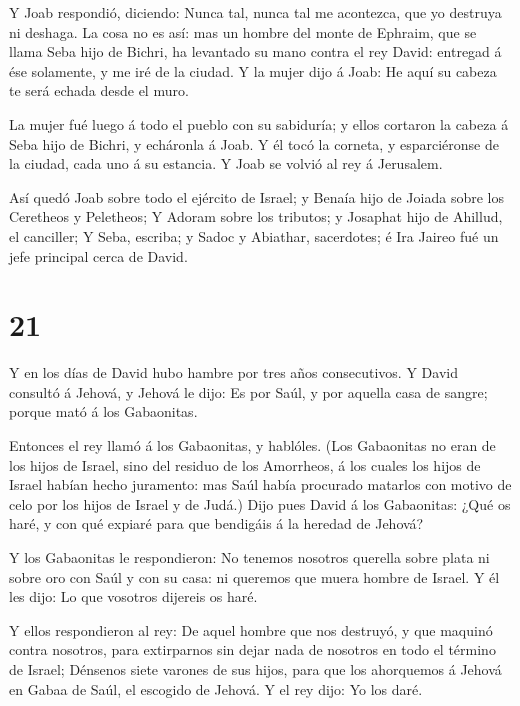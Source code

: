  Y Joab respondió, diciendo: Nunca tal, nunca tal me
acontezca, que yo destruya ni deshaga.  La cosa no es así:
mas un hombre del monte de Ephraim, que se llama Seba hijo de Bichri, ha
levantado su mano contra el rey David: entregad á ése solamente, y me
iré de la ciudad. Y la mujer dijo á Joab: He aquí su cabeza te será
echada desde el muro.

 La mujer fué luego á todo el pueblo con su sabiduría; y
ellos cortaron la cabeza á Seba hijo de Bichri, y echáronla á Joab. Y él
tocó la corneta, y esparciéronse de la ciudad, cada uno á su estancia. Y
Joab se volvió al rey á Jerusalem.

 Así quedó Joab sobre todo el ejército de Israel; y Benaía
hijo de Joiada sobre los Ceretheos y Peletheos;  Y Adoram
sobre los tributos; y Josaphat hijo de Ahillud, el canciller;
 Y Seba, escriba; y Sadoc y Abiathar, sacerdotes; é Ira
Jaireo fué un jefe principal cerca de David. 

\hypertarget{section-20}{%
\section{21}\label{section-20}}

 Y en los días de David hubo hambre por tres años
consecutivos. Y David consultó á Jehová, y Jehová le dijo: Es por Saúl,
y por aquella casa de sangre; porque mató á los Gabaonitas.

 Entonces el rey llamó á los Gabaonitas, y hablóles. (Los
Gabaonitas no eran de los hijos de Israel, sino del residuo de los
Amorrheos, á los cuales los hijos de Israel habían hecho juramento: mas
Saúl había procurado matarlos con motivo de celo por los hijos de Israel
y de Judá.)  Dijo pues David á los Gabaonitas: ¿Qué os haré,
y con qué expiaré para que bendigáis á la heredad de Jehová?

 Y los Gabaonitas le respondieron: No tenemos nosotros
querella sobre plata ni sobre oro con Saúl y con su casa: ni queremos
que muera hombre de Israel. Y él les dijo: Lo que vosotros dijereis os
haré.

 Y ellos respondieron al rey: De aquel hombre que nos
destruyó, y que maquinó contra nosotros, para extirparnos sin dejar nada
de nosotros en todo el término de Israel;  Dénsenos siete
varones de sus hijos, para que los ahorquemos á Jehová en Gabaa de Saúl,
el escogido de Jehová. Y el rey dijo: Yo los daré.

